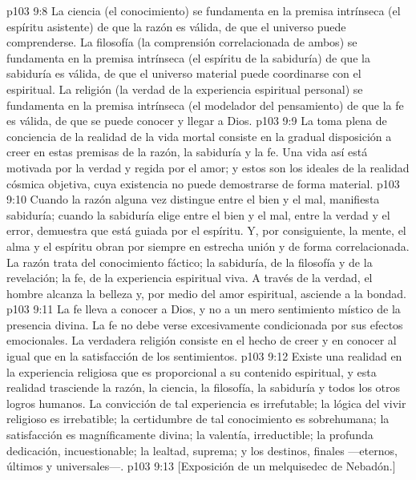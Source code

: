 \vs p103 9:8 \pc La ciencia (el conocimiento) se fundamenta en la premisa intrínseca (el espíritu asistente) de que la razón es válida, de que el universo puede comprenderse. La filosofía (la comprensión correlacionada de ambos) se fundamenta en la premisa intrínseca (el espíritu de la sabiduría) de que la sabiduría es válida, de que el universo material puede coordinarse con el espiritual. La religión (la verdad de la experiencia espiritual personal) se fundamenta en la premisa intrínseca (el modelador del pensamiento) de que la fe es válida, de que se puede conocer y llegar a Dios.
\vs p103 9:9 La toma plena de conciencia de la realidad de la vida mortal consiste en la gradual disposición a creer en estas premisas de la razón, la sabiduría y la fe. Una vida así está motivada por la verdad y regida por el amor; y estos son los ideales de la realidad cósmica objetiva, cuya existencia no puede demostrarse de forma material.
\vs p103 9:10 Cuando la razón alguna vez distingue entre el bien y el mal, manifiesta sabiduría; cuando la sabiduría elige entre el bien y el mal, entre la verdad y el error, demuestra que está guiada por el espíritu. Y, por consiguiente, la mente, el alma y el espíritu obran por siempre en estrecha unión y de forma correlacionada. La razón trata del conocimiento fáctico; la sabiduría, de la filosofía y de la revelación; la fe, de la experiencia espiritual viva. A través de la verdad, el hombre alcanza la belleza y, por medio del amor espiritual, asciende a la bondad.
\vs p103 9:11 La fe lleva a conocer a Dios, y no a un mero sentimiento místico de la presencia divina. La fe no debe verse excesivamente condicionada por sus efectos emocionales. La verdadera religión consiste en el hecho de creer y en conocer al igual que en la satisfacción de los sentimientos.
\vs p103 9:12 \pc Existe una realidad en la experiencia religiosa que es proporcional a su contenido espiritual, y esta realidad trasciende la razón, la ciencia, la filosofía, la sabiduría y todos los otros logros humanos. La convicción de tal experiencia es irrefutable; la lógica del vivir religioso es irrebatible; la certidumbre de tal conocimiento es sobrehumana; la satisfacción es magníficamente divina; la valentía, irreductible; la profunda dedicación, incuestionable; la lealtad, suprema; y los destinos, finales ---eternos, últimos y universales---.
\vsetoff
\vs p103 9:13 [Exposición de un melquisedec de Nebadón.]
